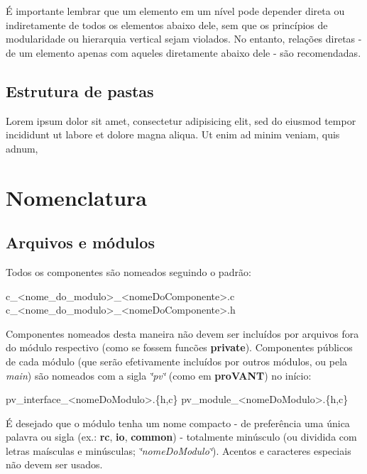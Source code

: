 É importante lembrar que um elemento em um nível pode depender direta ou indiretamente de todos os elementos abaixo dele, sem que os princípios de modularidade ou hierarquia vertical sejam violados. No entanto, relações diretas -\/ de um elemento apenas com aqueles diretamente abaixo dele -\/ são recomendadas.\hypertarget{page_naming_page_naming_subsec_foldertree}{}\subsection{Estrutura de pastas}\label{page_naming_page_naming_subsec_foldertree}
Lorem ipsum dolor sit amet, consectetur adipisicing elit, sed do eiusmod tempor incididunt ut labore et dolore magna aliqua. Ut enim ad minim veniam, quis adnum,\hypertarget{page_naming_page_naming_sec_naming}{}\section{Nomenclatura}\label{page_naming_page_naming_sec_naming}
\hypertarget{page_naming_page_naming_subsec_filenaming}{}\subsection{Arquivos e módulos}\label{page_naming_page_naming_subsec_filenaming}
Todos os componentes são nomeados seguindo o padrão\+:


\begin{DoxyCode}
c\_<nome\_do\_modulo>\_<nomeDoComponente>.c
c\_<nome\_do\_modulo>\_<nomeDoComponente>.h 
\end{DoxyCode}


Componentes nomeados desta maneira não devem ser incluídos por arquivos fora do módulo respectivo (como se fossem funcões {\bfseries private}). Componentes públicos de cada módulo (que serão efetivamente incluídos por outros módulos, ou pela {\itshape main}) são nomeados com a sigla {\itshape \char`\"{}pv\char`\"{}} (como em {\bfseries pro\+V\+A\+NT}) no início\+:


\begin{DoxyCode}
pv\_interface\_<nomeDoModulo>.\{h,c\}
pv\_module\_<nomeDoModulo>.\{h,c\} 
\end{DoxyCode}


É desejado que o módulo tenha um nome compacto -\/ de preferência uma única palavra ou sigla (ex.\+: {\bfseries rc}, {\bfseries io}, {\bfseries common}) -\/ totalmente minúsculo (ou dividida com letras maísculas e minúsculas; {\itshape \char`\"{}nome\+Do\+Modulo\char`\"{}}). Acentos e caracteres especiais não devem ser usados.


